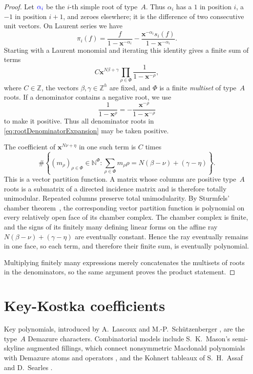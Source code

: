 \documentclass[11pt,reqno]{amsart}
\theoremstyle{definition}
\newcommand{\setN}{\mathbb{N}}
\newcommand{\setZ}{\mathbb{Z}}
\newcommand{\xvec}{\mathbf{x}}
\newcommand{\defin}[1]{%
  \relax\ifmmode%
  \textcolor{blue}{#1}%
  \else\textcolor{blue}{\emph{#1}}%
  \fi%
}
\begin{document}
\begin{proof}
Let \(\defin{\alpha_i}\) be the \(i\)-th simple root of type~\(A\).  Thus
\(\alpha_i\) has a \(1\) in position \(i\), a \(-1\) in position \(i+1\),
and zeroes elsewhere; it is the difference of two consecutive unit vectors.
On Laurent series we have
\[
\pi_i(f)
=
\frac{f}{1-\xvec^{-\alpha_i}}
-
\frac{\xvec^{-\alpha_i}s_i(f)}{1-\xvec^{-\alpha_i}}.
\]
Starting with a Laurent monomial and iterating this identity gives a finite
sum of terms
\begin{equation}
\label{eq:rootDenominatorExpansion}
C\xvec^{N\beta+\gamma}
\prod_{\rho\in\Phi}
\frac{1}{1-\xvec^{-\rho}},
\end{equation}
where \(C\in\setZ\), the vectors \(\beta,\gamma\in\setZ^h\) are fixed, and
\(\Phi\) is a finite \emph{multiset} of type~\(A\) roots.  If a denominator
contains a negative root, we use
\[
\frac{1}{1-\xvec^\rho}
=-
\frac{\xvec^{-\rho}}{1-\xvec^{-\rho}}
\]
to make it positive.  Thus all denominator roots in
\eqref{eq:rootDenominatorExpansion} may be taken positive.

The coefficient of \(\xvec^{N\nu+\eta}\) in one such term is \(C\) times
\[
\#\left\{(m_\rho)_{\rho\in\Phi}\in\setN^\Phi:
  \sum_{\rho\in\Phi}m_\rho\rho
  =N(\beta-\nu)+(\gamma-\eta)\right\}.
\]
This is a vector partition function.
A matrix whose columns are positive type~\(A\) roots
is a submatrix of a directed incidence matrix and is therefore totally
unimodular.  Repeated columns preserve total unimodularity.  By Sturmfels'
chamber theorem~\cite{Sturmfels1995}, the corresponding vector partition
function is polynomial on every relatively open face of its chamber complex.
The chamber complex is finite, and the signs of its finitely many defining
linear forms on the affine ray \(N(\beta-\nu)+(\gamma-\eta)\) are eventually
constant.  Hence the ray eventually remains in one face, so each term, and
therefore their finite sum, is eventually polynomial.

Multiplying finitely many expressions merely concatenates the multisets of
roots in the denominators, so the same argument proves the product statement.
\end{proof}

\section{Key-Kostka coefficients}
\label{sec:keyKostka}

Key polynomials, introduced by A.~Lascoux and M.-P.~Sch\"utzenberger
\cite{Lascoux1990Keys}, are the type~\(A\) Demazure characters.  Combinatorial
models include S.~K.~Mason's semi-skyline augmented fillings, which connect
nonsymmetric Macdonald polynomials with Demazure atoms and operators
\cite{Mason2009}, and the Kohnert tableaux of S.~H.~Assaf and D.~Searles
\cite{AssafSearles2018,AssafSearles2019}.
\end{document}
